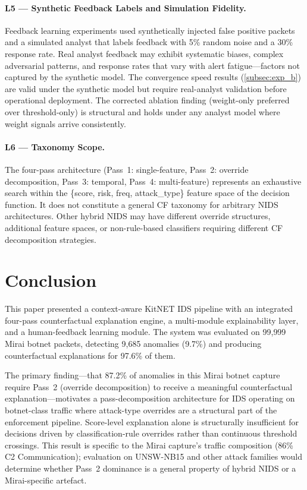 \documentclass[preprint,12pt,authoryear]{elsarticle}
\begin{document}
\paragraph{L5 --- Synthetic Feedback Labels and Simulation Fidelity.}
Feedback learning experiments used synthetically injected false positive packets
and a simulated analyst that labels feedback with 5\% random noise and a 30\%
response rate. Real analyst feedback may exhibit systematic biases, complex
adversarial patterns, and response rates that vary with alert fatigue---factors
not captured by the synthetic model. The convergence speed results
(\cref{subsec:exp_b}) are valid under the synthetic model but require
real-analyst validation before operational deployment. The corrected ablation
finding (weight-only preferred over threshold-only) is structural and holds
under any analyst model where weight signals arrive consistently.

\paragraph{L6 --- Taxonomy Scope.}
The four-pass architecture (Pass~1: single-feature, Pass~2: override
decomposition, Pass~3: temporal, Pass~4: multi-feature) represents an exhaustive
search within the \{score, risk, freq, attack\_type\} feature space of the
decision function. It does not constitute a general CF taxonomy for arbitrary
NIDS architectures. Other hybrid NIDS may have different override structures,
additional feature spaces, or non-rule-based classifiers requiring different CF
decomposition strategies.

\section{Conclusion}
\label{sec:conclusion}

This paper presented a context-aware KitNET IDS pipeline with an integrated
four-pass counterfactual explanation engine, a multi-module explainability layer,
and a human-feedback learning module. The system was evaluated on 99{,}999 Mirai
botnet packets, detecting 9{,}685 anomalies (9.7\%) and producing counterfactual
explanations for 97.6\% of them.

The primary finding---that 87.2\% of anomalies in this Mirai botnet capture
require Pass~2 (override decomposition) to receive a meaningful counterfactual
explanation---motivates a pass-decomposition architecture for IDS operating on
botnet-class traffic where attack-type overrides are a structural part of
the enforcement pipeline. Score-level explanation alone is structurally
insufficient for decisions driven by classification-rule overrides rather than
continuous threshold crossings. This result is specific to the Mirai capture's
traffic composition (86\% C2 Communication); evaluation on UNSW-NB15 and other
attack families would determine whether Pass~2 dominance is a general property
of hybrid NIDS or a Mirai-specific artefact.
\end{document}
